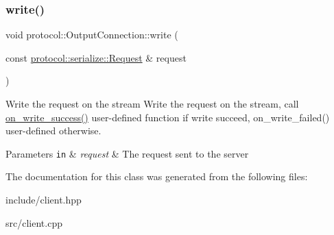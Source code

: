 \subsubsection{\texorpdfstring{write()}{write()}}
{\footnotesize\ttfamily void protocol\+::\+Output\+Connection\+::write (\begin{DoxyParamCaption}\item[{const \hyperlink{structprotocol_1_1serialize_1_1_request}{protocol\+::serialize\+::\+Request} \&}]{request }\end{DoxyParamCaption})}



Write the request on the stream Write the request on the stream, call \hyperlink{classprotocol_1_1_output_connection_a98750b6398a6280fc778e5c0fb0ea14e}{on\+\_\+write\+\_\+success()} user-\/defined function if write succeed, on\+\_\+write\+\_\+failed() user-\/defined otherwise. 


\begin{DoxyParams}[1]{Parameters}
\mbox{\tt in}  & {\em request} & The request sent to the server \\
\hline
\end{DoxyParams}


The documentation for this class was generated from the following files\+:\begin{DoxyCompactItemize}
\item 
include/client.\+hpp\item 
src/client.\+cpp\end{DoxyCompactItemize}
